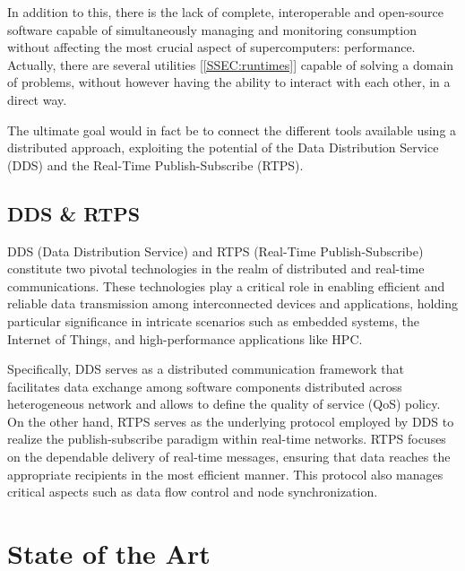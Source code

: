 In addition to this, there is the lack of complete, interoperable and open-source software capable of simultaneously managing and monitoring consumption without affecting the most crucial aspect of supercomputers: performance. Actually, there are several utilities [\ref{SSEC:runtimes}] capable of solving a domain of problems, without however having the ability to interact with each other, in a direct way.

The ultimate goal would in fact be to connect the different tools available using a distributed approach, exploiting the potential of the Data Distribution Service (DDS) and the Real-Time Publish-Subscribe (RTPS).%

\subsection{DDS \& RTPS} \label{SEC:dds}
DDS (Data Distribution Service)\cite{DDS} and RTPS (Real-Time Publish-Subscribe)\cite{RTPS} constitute two pivotal technologies in the realm of distributed and real-time communications. These technologies play a critical role in enabling efficient and reliable data transmission among interconnected devices and applications, holding particular significance in intricate scenarios such as embedded systems, the Internet of Things, and high-performance applications like HPC.

Specifically, DDS serves as a distributed communication framework that facilitates data exchange among software components distributed across heterogeneous network and allows to define the quality of service (QoS) policy. On the other hand, RTPS serves as the underlying protocol employed by DDS to realize the publish-subscribe paradigm within real-time networks. RTPS focuses on the dependable delivery of real-time messages, ensuring that data reaches the appropriate recipients in the most efficient manner. This protocol also manages critical aspects such as data flow control and node synchronization.

\section{State of the Art} \label{SEC:soa}

